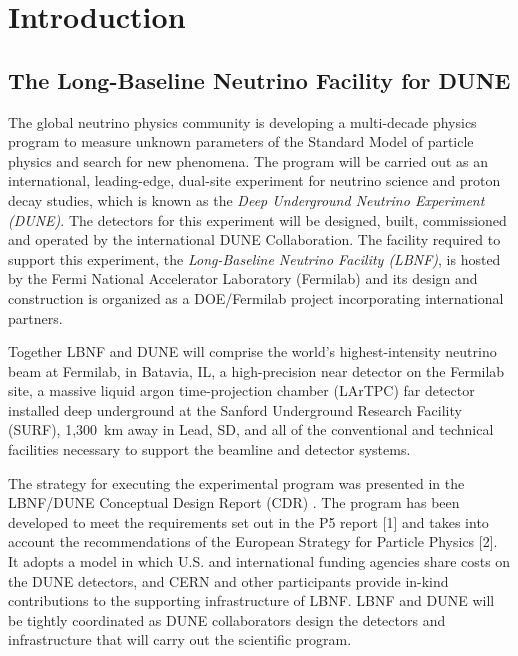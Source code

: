 \chapter{Introduction}
\label{ch:fscf-intro}

\section{The Long-Baseline Neutrino Facility for DUNE}
\label{sec:fs-facil-context}

The global neutrino physics community is developing a multi-decade physics program to measure 
unknown parameters of the Standard Model of particle physics and search for new phenomena. The 
program will be carried out as an international, leading-edge, dual-site experiment for neutrino science 
and proton decay studies, which is known as the \textit{Deep Underground Neutrino Experiment (DUNE)}. 
The detectors for this experiment will be designed, built, commissioned and operated by the international 
DUNE Collaboration. The facility required to support this experiment, the \textit{Long-Baseline Neutrino 
Facility (LBNF)}, is hosted by the Fermi National Accelerator
 Laboratory (Fermilab) and its design and construction is organized as a DOE/Fermilab project 
incorporating international partners. 

Together LBNF and DUNE will comprise the world's highest-intensity 
neutrino beam at Fermilab, in Batavia, IL, a high-precision near detector on the Fermilab site, 
a massive liquid argon time-projection chamber (LArTPC) far detector installed deep underground 
at the Sanford Underground Research Facility (SURF), 1,300~km away in Lead, SD, and all of the conventional and technical 
facilities necessary to support the beamline and detector systems.

The strategy for executing the experimental program was presented in the LBNF/DUNE Conceptual Design Report (CDR) . The program  
has been developed to meet the requirements set out in the P5 report [1]  and takes into 
account the recommendations of the European Strategy for Particle Physics [2].  It adopts a 
model in which U.S. and international funding agencies share costs on the DUNE detectors, and CERN and 
other participants provide in-kind contributions to the supporting infrastructure of LBNF. LBNF and DUNE 
will be tightly coordinated as DUNE collaborators design the detectors and infrastructure that will carry out 
the scientific program.

